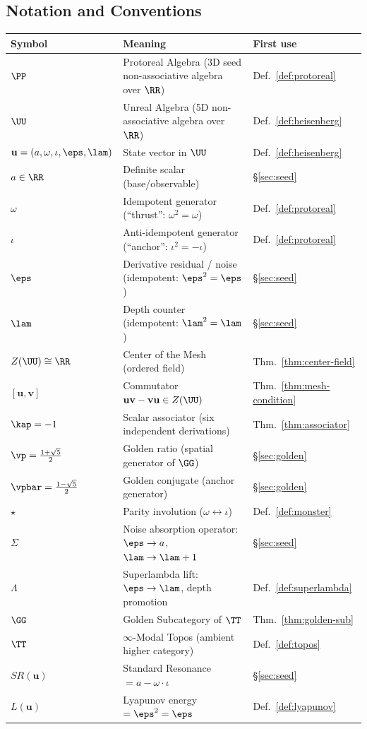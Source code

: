 \newpage

\subsection*{Notation and Conventions}

\begin{tabular}{@{}lll@{}}
\toprule
\textbf{Symbol} & \textbf{Meaning} & \textbf{First use} \\
\midrule
$\PP$ & Protoreal Algebra (3D seed non-associative algebra over $\RR$) & Def.~\ref{def:protoreal} \\
$\UU$ & Unreal Algebra (5D non-associative algebra over $\RR$) & Def.~\ref{def:heisenberg} \\
$\mathbf{u} = (a, \omega, \iota, \eps, \lam)$ & State vector in $\UU$ & Def.~\ref{def:heisenberg} \\
$a \in \RR$ & Definite scalar (base/observable) & \S\ref{sec:seed} \\
$\omega$ & Idempotent generator (``thrust'': $\omega^2 = \omega$) & Def.~\ref{def:protoreal} \\
$\iota$ & Anti-idempotent generator (``anchor'': $\iota^2 = -\iota$) & Def.~\ref{def:protoreal} \\
$\eps$ & Derivative residual / noise (idempotent: $\eps^2 = \eps$) & \S\ref{sec:seed} \\
$\lam$ & Depth counter (idempotent: $\lam^2 = \lam$) & \S\ref{sec:seed} \\
$Z(\UU) \cong \RR$ & Center of the Mesh (ordered field) & Thm.~\ref{thm:center-field} \\
$[\mathbf{u}, \mathbf{v}]$ & Commutator $\mathbf{uv} - \mathbf{vu} \in Z(\UU)$ & Thm.~\ref{thm:mesh-condition} \\
$\kap = -1$ & Scalar associator (six independent derivations) & Thm.~\ref{thm:associator} \\
$\vp = \tfrac{1+\sqrt{5}}{2}$ & Golden ratio (spatial generator of $\GG$) & \S\ref{sec:golden} \\
$\vpbar = \tfrac{1-\sqrt{5}}{2}$ & Golden conjugate (anchor generator) & \S\ref{sec:golden} \\
$\star$ & Parity involution ($\omega \leftrightarrow \iota$) & Def.~\ref{def:monster} \\
$\Sigma$ & Noise absorption operator: $\eps \to a$, $\lam \to \lam+1$ & \S\ref{sec:seed} \\
$\Lambda$ & Superlambda lift: $\eps \to \lam$, depth promotion & Def.~\ref{def:superlambda} \\
$\GG$ & Golden Subcategory of $\TT$ & Thm.~\ref{thm:golden-sub} \\
$\TT$ & $\infty$-Modal Topos (ambient higher category) & Def.~\ref{def:topos} \\
$SR(\mathbf{u})$ & Standard Resonance $= a - \omega \cdot \iota$ & \S\ref{sec:seed} \\
$L(\mathbf{u})$ & Lyapunov energy $= \eps^2 = \eps$ & Def.~\ref{def:lyapunov} \\
\bottomrule
\end{tabular}

